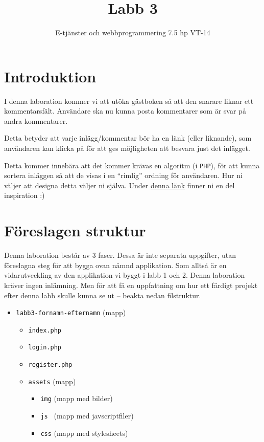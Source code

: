 \documentclass[12pt]{article}
\date{}
\title{ Labb 3 }
\author{ E-tjänster och webbprogrammering 7.5 hp VT-14 }
\begin{document}
\maketitle
\vspace{-2em}



\section{Introduktion}
I denna laboration kommer vi att utöka gästboken så att den snarare liknar ett kommentarsfält. Användare ska nu kunna posta kommentarer som är svar på andra kommentarer.

Detta betyder att varje inlägg/kommentar bör ha en länk (eller liknande), som användaren kan klicka på för att ges möjligheten att besvara just det inlägget.

Detta kommer innebära att det kommer krävas en algoritm (i \texttt{PHP}), för att kunna sortera inläggen så att de visas i en ``rimlig'' ordning för användaren. Hur ni väljer att designa detta väljer ni själva. Under \href{http://designm.ag/designer-showcase/well-designed-threaded-comments-sections-in-webpages/}{denna länk} finner ni en del inspiration :)



\section{Föreslagen struktur}
Denna laboration består av 3 faser. Dessa är inte separata uppgifter, utan föreslagna steg för att bygga ovan nämnd applikation. Som alltså är en vidarutveckling av den applikation vi byggt i labb 1 och 2. Denna laboration kräver ingen inlämning. Men för att få en uppfattning om hur ett färdigt projekt efter denna labb skulle kunna se ut -- beakta nedan filstruktur.
\begin{itemize}
  \item \texttt{labb3-fornamn-efternamn} (mapp)
  \begin{itemize}
    \item \texttt{index.php}
    \item \texttt{login.php}
    \item \texttt{register.php}
    \item \texttt{assets} (mapp)
    \begin{itemize}
      \item \texttt{img} (mapp med bilder)
      \item \texttt{js } (mapp med javscriptfiler)
      \item \texttt{css} (mapp med stylesheets)
    \end{itemize}
  \end{itemize}
\end{itemize}
\end{document}
